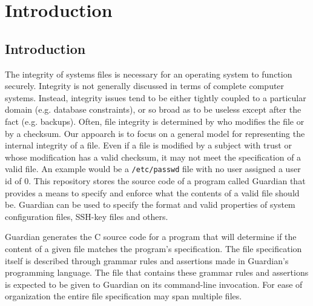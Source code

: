 
\chapter{Introduction}
{
	\section{Introduction}
	{
		The integrity of systems files is necessary for an operating system to
		function securely.  Integrity is not generally discussed in terms of
		complete computer systems. Instead, integrity issues tend to be either
		tightly coupled to a particular domain (e.g. database constraints), or
		so broad as to be useless except after the fact (e.g. backups).
		Often, file integrity is determined by who modifies the file or by a
		checksum. Our appoarch is to focus on a general model for representing
		the internal integrity of a file. Even if a file is modified by a
		subject with trust or whose modification has a valid checksum, it may
		not meet the specification of a valid file. An example would be a
		\texttt{/etc/passwd} file with no user assigned a user id of 0. This
		repository stores the source code of a program called Guardian that
		provides a means to specify and enforce what the contents of a valid
		file should be.
		Guardian can be used to specify the format and valid properties of
		system configuration files, SSH-key files and others.
		
		Guardian generates the C source code for a program that will determine
		if the content of a given file matches the program's specification.
		The file specification itself is
		described through grammar rules and assertions made in Guardian's
		programming language. The file that contains these grammar rules and
		assertions is expected to be given to Guardian on its command-line
		invocation.
		For ease of organization the entire file specification may span multiple
		files.
	}
}



















